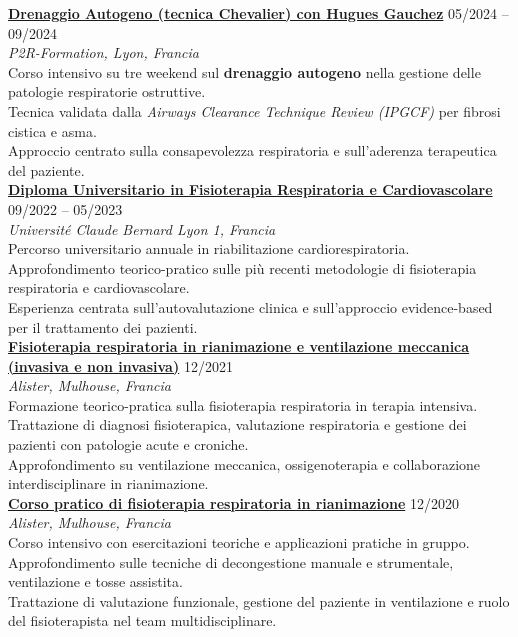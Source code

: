 \documentclass[a4paper]{article}
\newcommand{\voice}[5]{\href{#4}{\textbf{#1}} \hfill #2 \\ \textit{#3} \\ {\small #5} \vspace{0.2cm} \\}
\begin{document}
    \voice{Drenaggio Autogeno (tecnica Chevalier) con Hugues Gauchez}
    {05/2024 – 09/2024}
    {P2R-Formation, Lyon, Francia}
    {}
    {
    Corso intensivo su tre weekend sul \textbf{drenaggio autogeno} nella gestione delle patologie respiratorie ostruttive.\\
    Tecnica validata dalla \emph{Airways Clearance Technique Review (IPGCF)} per fibrosi cistica e asma.\\
    Approccio centrato sulla consapevolezza respiratoria e sull’aderenza terapeutica del paziente.
    }
\voice{Diploma Universitario in Fisioterapia Respiratoria e Cardiovascolare}
{09/2022 -- 05/2023}
{Université Claude Bernard Lyon 1, Francia}
{}
{
Percorso universitario annuale in riabilitazione cardiorespiratoria.\\
Approfondimento teorico-pratico sulle più recenti metodologie di fisioterapia respiratoria e cardiovascolare.\\
Esperienza centrata sull’autovalutazione clinica e sull’approccio evidence-based per il trattamento dei pazienti.
}
%
%
\voice{Fisioterapia respiratoria in rianimazione e ventilazione meccanica (invasiva e non invasiva)}
{12/2021}
{Alister, Mulhouse, Francia}
{}
{
Formazione teorico-pratica sulla fisioterapia respiratoria in terapia intensiva.\\
Trattazione di diagnosi fisioterapica, valutazione respiratoria e gestione dei pazienti con patologie acute e croniche.\\
Approfondimento su ventilazione meccanica, ossigenoterapia e collaborazione interdisciplinare in rianimazione.
}
%
%
\voice{Corso pratico di fisioterapia respiratoria in rianimazione}
{12/2020}
{Alister, Mulhouse, Francia}
{}
{
Corso intensivo con esercitazioni teoriche e applicazioni pratiche in gruppo.\\
Approfondimento sulle tecniche di decongestione manuale e strumentale, ventilazione e tosse assistita.\\
Trattazione di valutazione funzionale, gestione del paziente in ventilazione e ruolo del fisioterapista nel team multidisciplinare.
}
\end{document}
